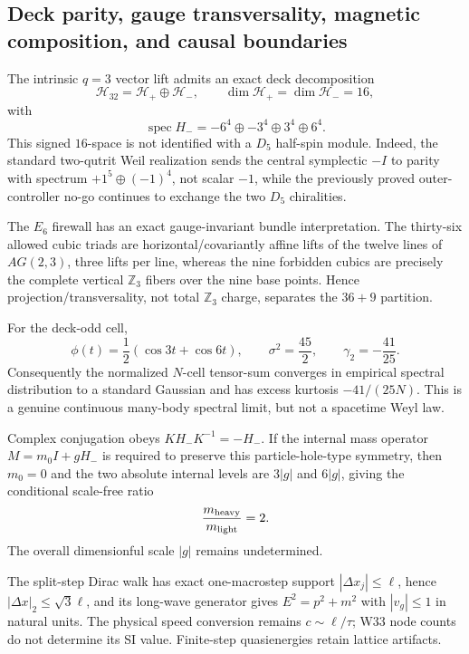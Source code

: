 \subsection{Deck parity, gauge transversality, magnetic composition, and causal boundaries}

The intrinsic $q=3$ vector lift admits an exact deck decomposition
\[
  \mathcal H_{32}=\mathcal H_+\oplus\mathcal H_-,\qquad
  \dim\mathcal H_+=\dim\mathcal H_-=16,
\]
with
\[
 \operatorname{spec}H_-=-6^4\oplus-3^4\oplus3^4\oplus6^4.
\]
This signed $16$-space is not identified with a $D_5$ half-spin module.  Indeed,
the standard two-qutrit Weil realization sends the central symplectic $-I$ to
parity with spectrum $+1^5\oplus(-1)^4$, not scalar $-1$, while the previously
proved outer-controller no-go continues to exchange the two $D_5$ chiralities.

The $E_6$ firewall has an exact gauge-invariant bundle interpretation.  The
thirty-six allowed cubic triads are horizontal/covariantly affine lifts of the
twelve lines of $AG(2,3)$, three lifts per line, whereas the nine forbidden
cubics are precisely the complete vertical $\mathbb Z_3$ fibers over the nine
base points.  Hence projection/transversality, not total $\mathbb Z_3$ charge,
separates the $36+9$ partition.

For the deck-odd cell,
\[
 \phi(t)=\frac12(\cos3t+\cos6t),\qquad
 \sigma^2=\frac{45}{2},\qquad \gamma_2=-\frac{41}{25}.
\]
Consequently the normalized $N$-cell tensor-sum converges in empirical spectral
distribution to a standard Gaussian and has excess kurtosis $-41/(25N)$.  This
is a genuine continuous many-body spectral limit, but not a spacetime Weyl law.

Complex conjugation obeys $KH_-K^{-1}=-H_-$.  If the internal mass operator
$M=m_0I+gH_-$ is required to preserve this particle-hole-type symmetry, then
$m_0=0$ and the two absolute internal levels are $3|g|$ and $6|g|$, giving the
conditional scale-free ratio
\[
 \frac{m_{\rm heavy}}{m_{\rm light}}=2.
\]
The overall dimensionful scale $|g|$ remains undetermined.

The split-step Dirac walk has exact one-macrostep support
$|\Delta x_j|\le\ell$, hence $|\Delta x|_2\le\sqrt3\ell$, and its long-wave
generator gives $E^2=p^2+m^2$ with $|v_g|\le1$ in natural units.  The physical
speed conversion remains $c\sim\ell/\tau$; W33 node counts do not determine its
SI value.  Finite-step quasienergies retain lattice artifacts.

